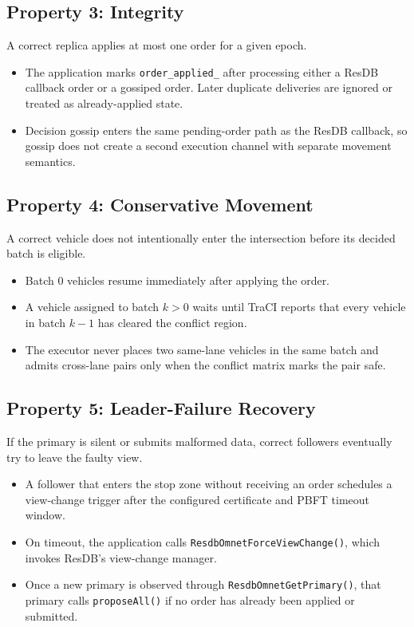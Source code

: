 \documentclass[fleqn,10pt]{olplainarticle}
\begin{document}
\subsection{Property 3: Integrity}

A correct replica applies at most one order for a given epoch.

\begin{itemize}
    \item The application marks \texttt{order\_applied\_} after processing either a ResDB callback order or a gossiped order. Later duplicate deliveries are ignored or treated as already-applied state.
    \item Decision gossip enters the same pending-order path as the ResDB callback, so gossip does not create a second execution channel with separate movement semantics.
\end{itemize}

\subsection{Property 4: Conservative Movement}

A correct vehicle does not intentionally enter the intersection before its decided batch is eligible.

\begin{itemize}
    \item Batch $0$ vehicles resume immediately after applying the order.
    \item A vehicle assigned to batch $k>0$ waits until TraCI reports that every vehicle in batch $k-1$ has cleared the conflict region.
    \item The executor never places two same-lane vehicles in the same batch and admits cross-lane pairs only when the conflict matrix marks the pair safe.
\end{itemize}

\subsection{Property 5: Leader-Failure Recovery}

If the primary is silent or submits malformed data, correct followers eventually try to leave the faulty view.

\begin{itemize}
    \item A follower that enters the stop zone without receiving an order schedules a view-change trigger after the configured certificate and PBFT timeout window.
    \item On timeout, the application calls \texttt{ResdbOmnetForceViewChange()}, which invokes ResDB's view-change manager.
    \item Once a new primary is observed through \texttt{ResdbOmnetGetPrimary()}, that primary calls \texttt{proposeAll()} if no order has already been applied or submitted.
\end{itemize}
\end{document}
